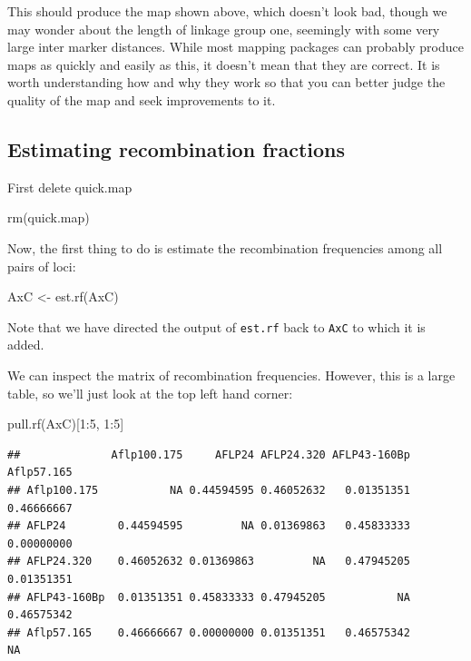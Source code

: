 \documentclass[
]{book}
\newenvironment{Shaded}{\begin{snugshade}}{\end{snugshade}}
\newcommand{\DecValTok}[1]{\textcolor[rgb]{0.00,0.00,0.81}{#1}}
\newcommand{\FunctionTok}[1]{\textcolor[rgb]{0.00,0.00,0.00}{#1}}
\newcommand{\NormalTok}[1]{#1}
\newcommand{\OtherTok}[1]{\textcolor[rgb]{0.56,0.35,0.01}{#1}}
\newcommand{\SpecialCharTok}[1]{\textcolor[rgb]{0.00,0.00,0.00}{#1}}
\begin{document}
This should produce the map shown above, which doesn't look bad, though we may wonder about the length of linkage group one, seemingly with some very large inter marker distances. While most mapping packages can probably produce maps as quickly and easily as this, it doesn't mean that they are correct. It is worth understanding how and why they work so that you can better judge the quality of the map and seek improvements to it.

\hypertarget{estimating-recombination-fractions}{%
\subsection{Estimating recombination fractions}\label{estimating-recombination-fractions}}

First delete quick.map

\begin{Shaded}
\begin{Highlighting}[]
\FunctionTok{rm}\NormalTok{(quick.map)}
\end{Highlighting}
\end{Shaded}

Now, the first thing to do is estimate the recombination frequencies among all pairs of loci:

\begin{Shaded}
\begin{Highlighting}[]
\NormalTok{AxC }\OtherTok{\textless{}{-}} \FunctionTok{est.rf}\NormalTok{(AxC)}
\end{Highlighting}
\end{Shaded}

Note that we have directed the output of \texttt{est.rf} back to \texttt{AxC} to which it is added.

We can inspect the matrix of recombination frequencies. However, this is a large table, so we'll just look at the top left hand corner:

\begin{Shaded}
\begin{Highlighting}[]
\FunctionTok{pull.rf}\NormalTok{(AxC)[}\DecValTok{1}\SpecialCharTok{:}\DecValTok{5}\NormalTok{, }\DecValTok{1}\SpecialCharTok{:}\DecValTok{5}\NormalTok{]}
\end{Highlighting}
\end{Shaded}

\begin{verbatim}
##              Aflp100.175     AFLP24 AFLP24.320 AFLP43-160Bp Aflp57.165
## Aflp100.175           NA 0.44594595 0.46052632   0.01351351 0.46666667
## AFLP24        0.44594595         NA 0.01369863   0.45833333 0.00000000
## AFLP24.320    0.46052632 0.01369863         NA   0.47945205 0.01351351
## AFLP43-160Bp  0.01351351 0.45833333 0.47945205           NA 0.46575342
## Aflp57.165    0.46666667 0.00000000 0.01351351   0.46575342         NA
\end{verbatim}
\end{document}
